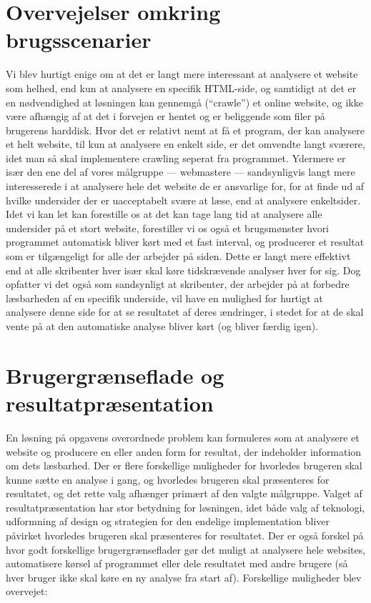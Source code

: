 \documentclass[a4paper,oneside,article]{memoir}
\begin{document}
\section{Overvejelser omkring brugsscenarier}
\label{brugsovervejelser}
Vi blev hurtigt enige om at det er langt mere interessant at analysere
et website som helhed, end kun at analysere en specifik HTML-side, og
samtidigt at det er en nødvendighed at løsningen kan gennemgå
(``crawle'') et online website, og ikke være afhængig af at det i
forvejen er hentet og er beliggende som filer på brugerens
harddisk. Hvor det er relativt nemt at få et program, der kan
analysere et helt website, til kun at analysere en enkelt side, er det
omvendte langt sværere, idet man så skal implementere crawling seperat
fra programmet. Ydermere er især den ene del af vores målgruppe ---
webmastere --- sandsynligvis langt mere interesserede i at
analysere hele det website de er ansvarlige for, for at finde ud af
hvilke undersider der er uacceptabelt svære at læse, end at analysere
enkeltsider. Idet vi kan let kan forestille os at det kan tage lang
tid at analysere alle undersider på et stort website, forestiller vi
os også et brugsmønster hvori programmet automatisk bliver kørt med et
fast interval, og producerer et resultat som er tilgængeligt for alle
der arbejder på siden. Dette er langt mere effektivt end at alle
skribenter hver især skal køre tidskrævende analyser hver for sig. Dog
opfatter vi det også som sandsynligt at skribenter, der arbejder på at
forbedre læsbarheden af en specifik underside, vil have en mulighed
for hurtigt at analysere denne side for at se resultatet af deres
ændringer, i stedet for at de skal vente på at den automatiske analyse
bliver kørt (og bliver færdig igen).

\section{Brugergrænseflade og resultatpræsentation}
\label{brugergraenseflade}
En løsning på opgavens overordnede problem kan formuleres som at
analysere et website og producere en eller anden form for resultat,
der indeholder information om dets læsbarhed. Der er flere forskellige
muligheder for hvorledes brugeren skal kunne sætte en analyse i gang,
og hvorledes brugeren skal præsenteres for resultatet, og det rette
valg afhænger primært af den valgte målgruppe. Valget af
resultatpræsentation har stor betydning for løsningen, idet både valg
af teknologi, udformning af design og strategien for den endelige
implementation bliver påvirket hvorledes brugeren skal præsenteres for
resultatet. Der er også forskel på hvor godt forskellige
brugergrænseflader gør det muligt at analysere hele websites,
automatisere kørsel af programmet eller dele resultatet med andre
brugere (så hver bruger ikke skal køre en ny analyse fra start
af). Forskellige muligheder blev overvejet:
\end{document}
